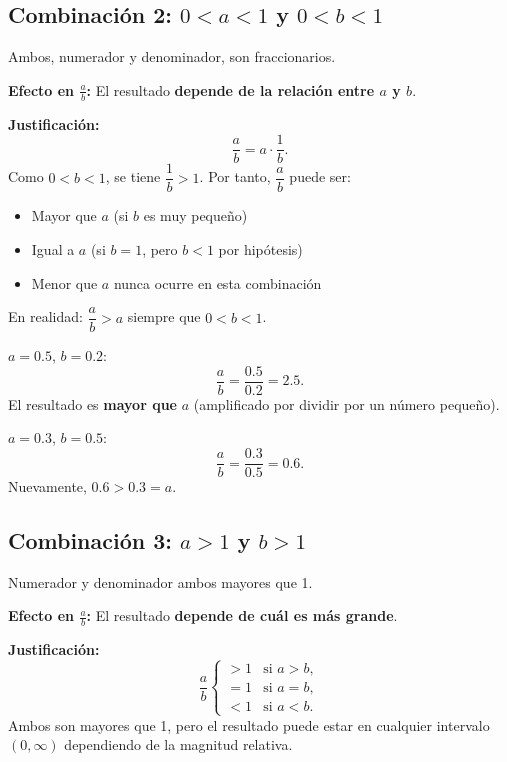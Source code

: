 \subsection{Combinación 2: $0 < a < 1$ y $0 < b < 1$}

\begin{caso}
Ambos, numerador y denominador, son fraccionarios.
\end{caso}

\textbf{Efecto en $\frac{a}{b}$:} El resultado \textbf{depende de la relación entre $a$ y $b$}.

\textbf{Justificación:}
\[
\frac{a}{b} = a \cdot \frac{1}{b}.
\]
Como $0 < b < 1$, se tiene $\dfrac{1}{b} > 1$. Por tanto, $\dfrac{a}{b}$ puede ser:
\begin{itemize}
\item Mayor que $a$ (si $b$ es muy pequeño)
\item Igual a $a$ (si $b = 1$, pero $b < 1$ por hipótesis)
\item Menor que $a$ nunca ocurre en esta combinación
\end{itemize}

En realidad: $\dfrac{a}{b} > a$ siempre que $0 < b < 1$.

\begin{ejemplo}
$a = 0.5$, $b = 0.2$:
\[
\frac{a}{b} = \frac{0.5}{0.2} = 2.5.
\]
El resultado es \textbf{mayor que} $a$ (amplificado por dividir por un número pequeño).
\end{ejemplo}

\begin{ejemplo}
$a = 0.3$, $b = 0.5$:
\[
\frac{a}{b} = \frac{0.3}{0.5} = 0.6.
\]
Nuevamente, $0.6 > 0.3 = a$.
\end{ejemplo}

\subsection{Combinación 3: $a > 1$ y $b > 1$}

\begin{caso}
Numerador y denominador ambos mayores que 1.
\end{caso}

\textbf{Efecto en $\frac{a}{b}$:} El resultado \textbf{depende de cuál es más grande}.

\textbf{Justificación:}
\[
\frac{a}{b} \begin{cases}
> 1 & \text{si } a > b, \\
= 1 & \text{si } a = b, \\
< 1 & \text{si } a < b.
\end{cases}
\]
Ambos son mayores que 1, pero el resultado puede estar en cualquier intervalo $(0, \infty)$ dependiendo de la magnitud relativa.

